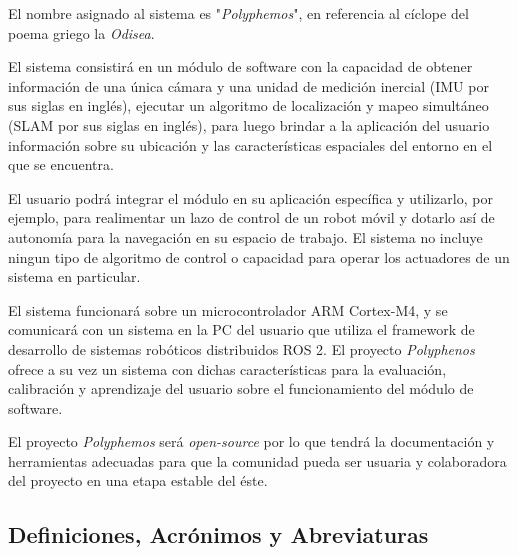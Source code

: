 \documentclass[12pt,a4paper, twosite]{article}
\begin{document}
El nombre asignado al sistema es "\textit{Polyphemos}", en referencia al cíclope del poema
griego la \textit{Odisea}.

El sistema consistirá en un módulo de software con la capacidad de obtener información de una única
cámara y una unidad de medición inercial (IMU por sus siglas en inglés), ejecutar un algoritmo de
localización y mapeo simultáneo (SLAM por sus siglas en inglés), para luego brindar a la aplicación
del usuario información sobre su ubicación y las características espaciales del entorno en el que se
encuentra.

El usuario podrá integrar el módulo en su aplicación específica y utilizarlo, por ejemplo, para
realimentar un lazo de control de un robot móvil y dotarlo así de autonomía para la navegación en su
espacio de trabajo. El sistema no incluye ningun tipo de algoritmo de control o capacidad para
operar los actuadores de un sistema en particular.

El sistema funcionará sobre un microcontrolador ARM Cortex-M4, y se comunicará con un sistema en la
PC del usuario que utiliza el framework de desarrollo de sistemas robóticos distribuidos ROS 2.
El proyecto \textit{Polyphenos} ofrece a su vez un sistema con dichas características para la
evaluación, calibración y aprendizaje del usuario sobre el funcionamiento del módulo de software.

El proyecto \textit{Polyphemos} será \textit{open-source} por lo que tendrá la documentación
y herramientas adecuadas para que la comunidad pueda ser usuaria y colaboradora del proyecto en una
etapa estable del éste.

\subsection{Definiciones, Acrónimos y Abreviaturas}
\label{sec:orgb158e36}

\end{document}

